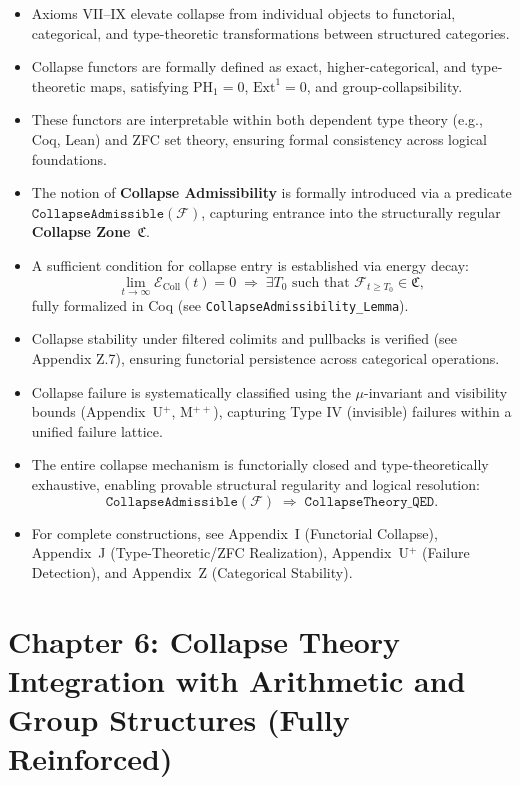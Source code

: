 \documentclass[11pt]{article}
\newcommand{\CollapseEnergy}{\mathcal{E}_{\mathrm{Coll}}}
\begin{document}
\begin{itemize}
    \item Axioms VII–IX elevate collapse from individual objects to functorial, categorical, and type-theoretic transformations between structured categories.
    \item Collapse functors are formally defined as exact, higher-categorical, and type-theoretic maps, satisfying $\mathrm{PH}_1 = 0$, $\mathrm{Ext}^1 = 0$, and group-collapsibility.
    \item These functors are interpretable within both dependent type theory (e.g., Coq, Lean) and ZFC set theory, ensuring formal consistency across logical foundations.
    \item The notion of \textbf{Collapse Admissibility} is formally introduced via a predicate $\texttt{CollapseAdmissible}(\mathcal{F})$, capturing entrance into the structurally regular \textbf{Collapse Zone}~$\mathfrak{C}$.
    \item A sufficient condition for collapse entry is established via energy decay:
    \[
    \lim_{t \to \infty} \CollapseEnergy(t) = 0 \;\Rightarrow\; \exists T_0 \text{ such that } \mathcal{F}_{t \geq T_0} \in \mathfrak{C},
    \]
    fully formalized in Coq (see \texttt{CollapseAdmissibility\_Lemma}).
    \item Collapse stability under filtered colimits and pullbacks is verified (see Appendix Z.7), ensuring functorial persistence across categorical operations.
    \item Collapse failure is systematically classified using the $\mu$-invariant and visibility bounds (Appendix~U$^+$, M$^{++}$), capturing Type IV (invisible) failures within a unified failure lattice.
    \item The entire collapse mechanism is functorially closed and type-theoretically exhaustive, enabling provable structural regularity and logical resolution:
    \[
    \texttt{CollapseAdmissible}(\mathcal{F}) \;\Rightarrow\; \texttt{CollapseTheory\_QED}.
    \]
    \item For complete constructions, see Appendix~I (Functorial Collapse), Appendix~J (Type-Theoretic/ZFC Realization), Appendix~U$^+$ (Failure Detection), and Appendix~Z (Categorical Stability).
\end{itemize}



\section{Chapter 6: Collapse Theory Integration with Arithmetic and Group Structures (Fully Reinforced)}
\end{document}
